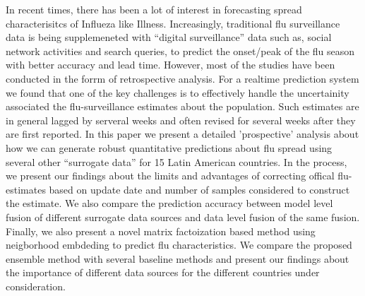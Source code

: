 In recent times, there has been a lot of interest in forecasting spread characterisitcs of
Influeza like Illness. Increasingly, traditional flu surveillance data
is being supplemeneted with ``digital surveillance'' data such as, social network
activities and search queries, to predict the onset/peak of the flu
season with better accuracy and lead time. However, most of the
studies have been conducted in the forrm of retrospective analysis. For a realtime prediction
system we found that one of the key challenges is to effectively handle the 
uncertainity associated the flu-surveillance estimates about the population. 
Such estimates are in general lagged by serveral weeks and often revised
for several weeks after they are first reported. In this paper we present a detailed 
'prospective' analysis about how we can generate robust quantitative predictions 
about flu spread using several other ``surrogate data'' for 15 Latin
American countries. In the process, we present our findings about the limits and
advantages of correcting offical flu-estimates based on update date and 
number of samples considered to construct the estimate. We also compare the 
prediction accuracy between model level fusion of different surrogate data sources
and data level fusion of the same fusion. Finally, we also present a
novel matrix factoization based method using neigborhood embdeding to
predict flu characteristics. We compare the proposed ensemble method
with several baseline methods and present our findings about the
importance of different data sources for the different countries under
consideration.
